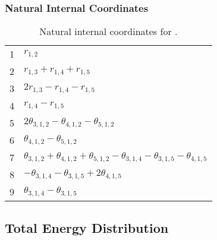 \documentclass[10pt,oneside]{article}
\begin{document}
\begin{table}[h!]
\subsubsection*{Natural Internal Coordinates}
\centering
\caption{Natural internal coordinates for .}
\small
\begin{tabular}{ll}
\toprule
  1   & $r_{1,2}$ \\
  2   & $r_{1,3} + r_{1,4} + r_{1,5}$ \\
  3   & $2r_{1,3} - r_{1,4} - r_{1,5}$ \\
  4   & $r_{1,4} - r_{1,5}$ \\
  5   & $2\theta_{3,1,2} - \theta_{4,1,2} - \theta_{5,1,2}$ \\
  6   & $\theta_{4,1,2} - \theta_{5,1,2}$ \\
  7   & $\theta_{3,1,2} + \theta_{4,1,2} + \theta_{5,1,2} - \theta_{3,1,4} - \theta_{3,1,5} - \theta_{4,1,5}$ \\
  8   & $-\theta_{3,1,4} - \theta_{3,1,5} + 2\theta_{4,1,5}$ \\
  9   & $\theta_{3,1,4} - \theta_{3,1,5}$ \\
\bottomrule
\end{tabular}
\end{table}

\begin{table}
\subsection*{Total Energy Distribution}
\centering\end{table}

\clearpage

\subsection{}
\end{document}
